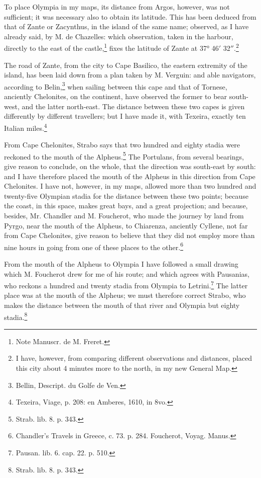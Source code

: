 \documentclass[a4paper, 11pt, oneside, polutonikogreek, english]{article}
\begin{document}
To place Olympia in my maps, its distance from Argos, however, was not sufficient; it was necessary also to obtain its latitude. This has been deduced from that of Zante or Zacynthus, in the island of the same name; observed, as I have already said, by M. de Chazelles: which observation, taken in the harbour, directly to the east of the castle,\footnote{Note Manuscr. de M. Freret.} fixes the latitude of Zante at 37° 46$'$ 32$''$.\footnote{I have, however, from comparing different observations and distances, placed this city about 4 minutes more to the north, in my new General Map.}

The road of Zante, from the city to Cape Basilico, the eastern extremity of the island, has been laid down from a plan taken by M. Verguin: and able navigators, according to Belin,\footnote{Bellin, Descript. du Golfe de Ven.} when sailing between this cape and that of Tornese, anciently Chelonites, on the continent, have observed the former to bear south-west, and the latter north-east. The distance between these two capes is given differently by different travellers; but I have made it, with Texeira, exactly ten Italian miles.\footnote{Texeira, Viage, p. 208: en Amberes, 1610, in 8vo.}

From Cape Chelonites, Strabo says that two hundred and eighty stadia were reckoned to the mouth of the Alpheus.\footnote{Strab. lib. 8. p. 343.} The Portulans, from several bearings, give reason to conclude, on the whole, that the direction was south-east by south: and I have therefore placed the mouth of the Alpheus in this direction from Cape Chelonites. I have not, however, in my maps, allowed more than two hundred and twenty-five Olympian stadia for the distance between these two points; because the coast, in this space, makes great bays, and a great projection; and because, besides, Mr. Chandler and M. Foucherot, who made the journey by land from Pyrgo, near the mouth of the Alpheus, to Chiarenza, anciently Cyllene, not far from Cape Chelonites, give reason to believe that they did not employ more than nine hours in going from one of these places to the other.\footnote{Chandler's Travels in Greece, c. 73. p. 284. Foucherot, Voyag. Manus.}

From the mouth of the Alpheus to Olympia I have followed a small drawing which M. Foucherot drew for me of his route; and which agrees with Pausanias, who reckons a hundred and twenty stadia from Olympia to Letrini.\footnote{Pausan. lib. 6. cap. 22. p. 510.} The latter place was at the mouth of the Alpheus; we must therefore correct Strabo, who makes the distance between the mouth of that river and Olympia but eighty stadia.\footnote{Strab. lib. 8. p. 343.}
\end{document}
